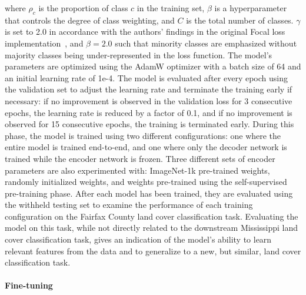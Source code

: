 where \(\rho_c\) is the proportion of class \(c\) in the training set, \(\beta\) is a hyperparameter that controls the degree of class weighting, and \(C\) is the total number of classes.
\(\gamma\) is set to 2.0 in accordance with the authors' findings in the original Focal loss implementation~\cite{linFocalLossDense2017}, and \(\beta=2.0\) such that minority classes are emphasized without majority classes being under-represented in the loss function.
The model's parameters are optimized using the AdamW optimizer with a batch size of 64 and an initial learning rate of 1e-4.
The model is evaluated after every epoch using the validation set to adjust the learning rate and terminate the training early if necessary: if no improvement is observed in the validation loss for 3 consecutive epochs, the learning rate is reduced by a factor of 0.1, and if no improvement is observed for 15 consecutive epochs, the training is terminated early.
During this phase, the model is trained using two different configurations: one where the entire model is trained end-to-end, and one where only the decoder network is trained while the encoder network is frozen.
Three different sets of encoder parameters are also experimented with: ImageNet-1k pre-trained weights, randomly initialized weights, and weights pre-trained using the self-supervised pre-training phase.
After each model has been trained, they are evaluated using the withheld testing set to examine the performance of each training configuration on the Fairfax County land cover classification task.
Evaluating the model on this task, while not directly related to the downstream Mississippi land cover classification task, gives an indication of the model's ability to learn relevant features from the data and to generalize to a new, but similar, land cover classification task.

\paragraph{Fine-tuning}

